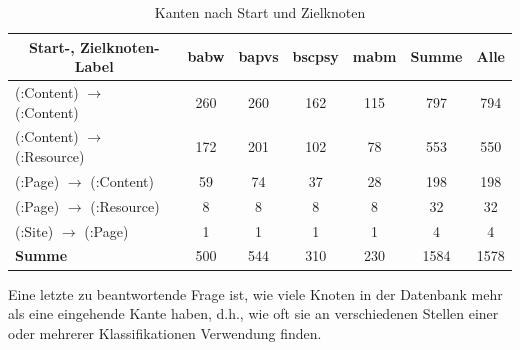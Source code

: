     \begin{table}[htb]
        \centering
        \begin{tabular}{|l|c|c|c|c|c|c|}
            \hline
            \multicolumn{1}{|c|}{\textbf{Start-, Zielknoten-Label}} & \textbf{\gls{babw}} & \textbf{\gls{bapvs}} & \textbf{\gls{bscpsy}} & \textbf{\gls{mabm}} & \textbf{Summe} & \textbf{Alle} \\ \hline
            (:Content) $\rightarrow$ (:Content)                           & 260           & 260            & 162             & 115           & 797            & 794           \\ \hline
            (:Content) $\rightarrow$ (:Resource)                         & 172           & 201            & 102             & 78            & 553            & 550           \\ \hline
            (:Page) $\rightarrow$ (:Content)                              & 59            & 74             & 37              & 28            & 198            & 198           \\ \hline
            (:Page) $\rightarrow$ (:Resource)                             & 8             & 8              & 8               & 8             & 32             & 32            \\ \hline
            (:Site) $\rightarrow$ (:Page)                                 & 1             & 1              & 1               & 1             & 4              & 4             \\ \hline
            \hline
            \textbf{Summe}                                          & 500           & 544            & 310             & 230           & 1584           & 1578          \\ \hline
        \end{tabular}
        \caption{Kanten nach Start und Zielknoten}
        \label{table:findingsTeachersFiguresEdgesByStartEndNodeLabel}
    \end{table}

    Eine letzte zu beantwortende Frage ist,
    wie viele Knoten in der Datenbank mehr als eine eingehende Kante haben,
    d.h., wie oft sie an verschiedenen Stellen einer oder mehrerer Klassifikationen Verwendung finden.

